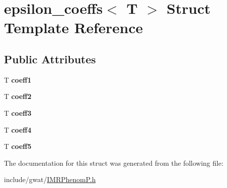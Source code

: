 \hypertarget{structepsilon__coeffs}{}\section{epsilon\+\_\+coeffs$<$ T $>$ Struct Template Reference}
\label{structepsilon__coeffs}
\subsection*{Public Attributes}
\begin{DoxyCompactItemize}
\item 
\mbox{\label{structepsilon__coeffs_ab9a930ed682c80d2febd0380480f1eb3}} 
T {\bfseries coeff1}
\item 
\mbox{\label{structepsilon__coeffs_a9ddc676353116186e8abde43522164c5}} 
T {\bfseries coeff2}
\item 
\mbox{\label{structepsilon__coeffs_aaaf9c13966c4550d9370d7529eaadfe6}} 
T {\bfseries coeff3}
\item 
\mbox{\label{structepsilon__coeffs_a87a3c5420d7d0b435fe4e68ee3534b5c}} 
T {\bfseries coeff4}
\item 
\mbox{\label{structepsilon__coeffs_a37f73b1cd1872b4bb54ac86582c5f26b}} 
T {\bfseries coeff5}
\end{DoxyCompactItemize}


The documentation for this struct was generated from the following file\+:\begin{DoxyCompactItemize}
\item 
include/gwat/\hyperlink{IMRPhenomP_8h}{I\+M\+R\+Phenom\+P.\+h}\end{DoxyCompactItemize}

